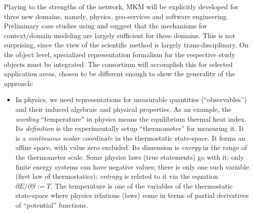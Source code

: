 \documentclass{llncs}
\def\openmath{\sc{OpenMath}}
\def\omdoc{\sc{OMDoc}}
\begin{document}
Playing to the strengths of the network, MKM will be explicitly developed for three new
domains, namely, physics, geo-services and software engineering. Preliminary case studies
using {\openmath} and {\omdoc} suggest that the mechanisms for context/domain modeling are
largely sufficient for these domains. This is not surprising, since the view of the
scientific method is largely trans-disciplinary. On the object level, specialized
representation formalism for the respective study objects must be integrated.  The
consortium will accomplish this for selected application areas, chosen to be different
enough to show the generality of the approach:
\begin{itemize}
\item In physics, we need representations for measurable quantities
  (``observables''\cite{PML:web}\cite{Sev:physml}) and their induced algebraic and
  physical properties.  As an example, the {\emph{wording}} ``temperature'' in physics
  means the equilibrium thermal heat index.  Its {\emph{definition}} is the experimentally
  setup ``thermometer'' for measuring it.  It is a {\emph{continuous scalar coordinate}}
  in the thermostatic state-space.  It forms an affine space, with value zero excluded.
  Its dimension is {\emph{energy}} in the range of the thermometer scale.  Some physics
  laws (true statements) go with it: only finite energy systems can have negative values;
  there is only one such variable (first law of thermostatics); {\emph{entropy}} is
  related to it via the equation $\partial E / \partial S := T $.  The temperature is one
  of the variables of the thermostatic state-space where physics relations (laws) come in
  terms of partial derivatives of ``potential'' functions.
  

\end{itemize}
\end{document}
